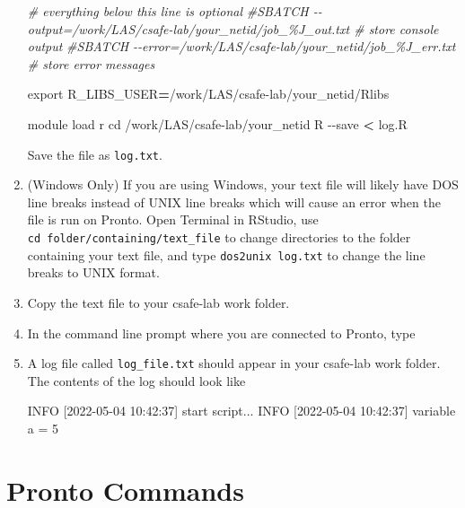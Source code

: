 \documentclass[
]{book}
\newenvironment{Shaded}{\begin{snugshade}}{\end{snugshade}}
\newcommand{\AttributeTok}[1]{\textcolor[rgb]{0.77,0.63,0.00}{#1}}
\newcommand{\BuiltInTok}[1]{#1}
\newcommand{\CommentTok}[1]{\textcolor[rgb]{0.56,0.35,0.01}{\textit{#1}}}
\newcommand{\ExtensionTok}[1]{#1}
\newcommand{\NormalTok}[1]{#1}
\newcommand{\OperatorTok}[1]{\textcolor[rgb]{0.81,0.36,0.00}{\textbf{#1}}}
\newcommand{\VariableTok}[1]{\textcolor[rgb]{0.00,0.00,0.00}{#1}}
\begin{document}
\begin{enumerate}
\begin{Shaded}
\begin{Highlighting}[]
\CommentTok{\# everything below this line is optional}
\CommentTok{\#SBATCH {-}{-}output=/work/LAS/csafe{-}lab/your\_netid/job\_\%J\_out.txt \# store console output}
\CommentTok{\#SBATCH {-}{-}error=/work/LAS/csafe{-}lab/your\_netid/job\_\%J\_err.txt \# store error messages}

\BuiltInTok{export} \VariableTok{R\_LIBS\_USER}\OperatorTok{=}\NormalTok{/work/LAS/csafe{-}lab/your\_netid/Rlibs}

\ExtensionTok{module}\NormalTok{ load r}
\BuiltInTok{cd}\NormalTok{ /work/LAS/csafe{-}lab/your\_netid}
\ExtensionTok{R} \AttributeTok{{-}{-}save} \OperatorTok{\textless{}}\NormalTok{ log.R}
\end{Highlighting}
\end{Shaded}

  Save the file as \texttt{log.txt}.
\item
  (Windows Only) If you are using Windows, your text file will likely have DOS line breaks instead of UNIX line breaks which will cause an error when the file is run on Pronto. Open Terminal in RStudio, use \texttt{cd\ folder/containing/text\_file} to change directories to the folder containing your text file, and type \texttt{dos2unix\ log.txt} to change the line breaks to UNIX format.
\item
  Copy the text file to your csafe-lab work folder.
\item
  In the command line prompt where you are connected to Pronto, type

\begin{Shaded}
\end{Shaded}
\item
  A log file called \texttt{log\_file.txt} should appear in your csafe-lab work folder. The contents of the log should look like

\begin{Shaded}
\begin{Highlighting}[]
\ExtensionTok{INFO}\NormalTok{ [2022{-}05{-}04 10:42:37] start script...}
\ExtensionTok{INFO}\NormalTok{ [2022{-}05{-}04 10:42:37] variable a = 5}
\end{Highlighting}
\end{Shaded}
\end{enumerate}

\hypertarget{pronto-commands}{%
\section{Pronto Commands}\label{pronto-commands}}
\end{document}
